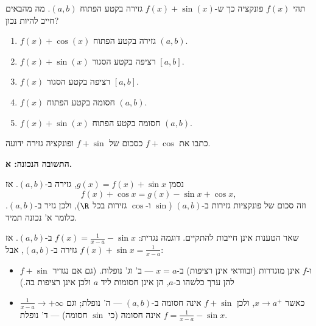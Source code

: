 
\begin{question}
תהי $f(x)$ פונקציה כך ש-$f(x)+\sin(x)$ גזירה בקטע הפתוח $(a,b)$. מה מהבאים חייב להיות נכון?
\begin{enumerate}
  \item $f(x)+\cos(x)$ גזירה בקטע הפתוח $(a,b)$.
  \item $f(x)+\sin(x)$ רציפה בקטע הסגור $[a,b]$.
  \item $f(x)$ רציפה בקטע הסגור $[a,b]$.
  \item $f(x)$ חסומה בקטע הפתוח $(a,b)$.
  \item $f(x)+\sin(x)$ חסומה בקטע הפתוח $(a,b)$.
\end{enumerate}
\end{question}

\begin{hint}
כתבו את $f+\cos$ כסכום של $f+\sin$ ופונקציה גזירה ידועה.
\end{hint}

\begin{solution}
\textbf{התשובה הנכונה: א.}

נסמן $g(x)=f(x)+\sin x$, גזירה ב-$(a,b)$. אז
\[ f(x)+\cos x=g(x)-\sin x+\cos x , \]
וזה סכום של פונקציות גזירות ב-$(a,b)$ ($\sin$ ו-$\cos$ גזירות בכל $\R$), ולכן גזיר ב-$(a,b)$. כלומר א' נכונה תמיד.

שאר הטענות אינן חייבות להתקיים. דוגמה נגדית: $f(x)=\frac{1}{x-a}-\sin x$ ב-$(a,b)$. אז $f(x)+\sin x=\frac{1}{x-a}$ גזירה ב-$(a,b)$, אבל:
\begin{itemize}
  \item $f+\sin$ ו-$f$ אינן מוגדרות (ובוודאי אינן רציפות) ב-$x=a$ --- ב' וג' נופלות. (גם אם נגדיר להן ערך כלשהו ב-$a$, הן אינן חסומות ליד $a$ ולכן אינן רציפות בה.)
  \item $\frac{1}{x-a}\to+\infty$ כאשר $x\to a^+$, ולכן $f+\sin$ אינה חסומה ב-$(a,b)$ --- ה' נופלת; וגם $f=\frac{1}{x-a}-\sin x$ אינה חסומה (כי $\sin$ חסומה) --- ד' נופלת.
\end{itemize}
\end{solution}
